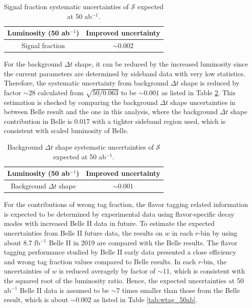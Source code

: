 \begin{table}[htpb]
	\centering
	\caption{ Signal fraction systematic uncertainties of $\mathcal{S}$ expected at 50 ab$^{-1}$.}
	\label{tab:sig_f}
	\begin{tabular}{c| c}
		\hline
		Luminosity (50 ab$^{-1}$) & Improved uncertainty \\
		\hline
		Signal fraction &  $\sim0.002$ \\
		\hline
	\end{tabular}
\end{table}

For the background $\Delta t$ shape, it can be reduced by the increased luminosity since the current parameters are determined by sideband data with very low statistics. Therefore, the systematic uncertainty from background $\Delta t$ shape is reduced by factor $\sim 28$ calculated from $\sqrt{50/0.063}$ to be $\sim 0.001$ as listed in Table \ref{tab:bkg_shape}. This estimation is checked by comparing the background $\Delta t$ shape uncertainties in between Belle result and the one in this analysis, where the background $\Delta t$ shape contribution in Belle is 0.017\cite{kang2020measurement} with a tighter sideband region used, which is consistent with scaled luminosity of Belle. 

\begin{table}[htpb]
	\centering
	\caption{ Background $\Delta t$ shape systematic uncertainties of $\mathcal{S}$ expected at 50 ab$^{-1}$.}
	\label{tab:bkg_shape}
	\begin{tabular}{c| c}
		\hline
		Luminosity (50 ab$^{-1}$) & Improved uncertainty \\
		\hline
		Background $\Delta t$ shape &  $\sim0.001$ \\
		\hline
	\end{tabular}
\end{table}

For the contributions of wrong tag fraction, the flavor tagging related information is expected to be determined by experimental data using flavor-specific decay modes with increased Belle II data in future. To estimate the expected uncertainties from Belle II future data, the results on $w$ in each $r$-bin by using about 8.7 fb$^{-1}$ Belle II in 2019 are compared with the Belle results\cite{abudinen2020first}. The flavor tagging performance studied by Belle II early data presented a close efficiency and wrong tag fraction values compared to Belle results. In each $r$-bin, the uncertainties of $w$ is reduced averagely by factor of $\sim 11$, which is consistent with the squared root of the luminosity ratio. Hence, the expected uncertainties at 50 ab$^{-1}$ Belle II data is assumed to be $\sim 7$ times smaller than those from the Belle result\cite{kang2020measurement}, which is about $\sim0.002$ as listed in Table \ref{tab:wtag_50ab}.

